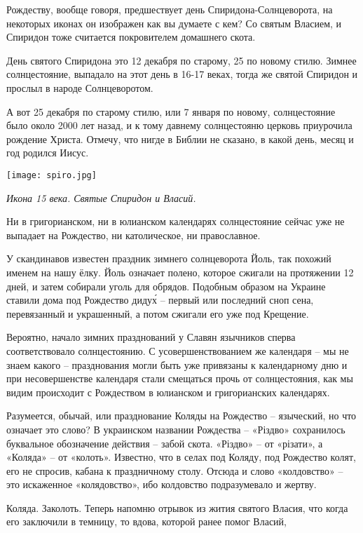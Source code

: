 \documentclass[a5paper,11pt,openany]{article}
\begin{document}
   Рождеству, вообще говоря, предшествует день Спиридона-Солнцеворота, на некоторых иконах он изображен как вы думаете с кем? Со святым Власием, и Спиридон тоже считается покровителем домашнего скота.

  День святого Спиридона это 12 декабря по старому, 25 по новому стилю. Зимнее солнцестояние, выпадало на этот день в 16-17 веках, тогда же святой Спиридон и прослыл в народе Солнцеворотом. 


А вот 25 декабря по старому стилю, или 7 января по новому, солнцестояние было около 2000 лет назад, и к тому давнему солнцестояню церковь приурочила рождение Христа. Отмечу, что нигде в Библии не сказано, в какой день, месяц и год родился Иисус.

\begin{center}
\texttt{[image: spiro.jpg]}

\textit{Икона 15 века. Святые Спиридон и Власий.}
\end{center}




   Ни в григорианском, ни в юлианском календарях солнцестояние сейчас уже не выпадает на Рождество, ни католическое, ни православное.

   У скандинавов известен праздник зимнего солнцеворота Йоль, так похожий именем на нашу ёлку. Йоль означает полено, которое сжигали на протяжении 12 дней, и затем собирали уголь для обрядов. Подобным образом на Украине ставили дома под Рождество диду\'х – первый или последний сноп сена, перевязанный и украшенный, а потом сжигали его уже под Крещение.

   Вероятно, начало зимних празднований у Славян язычников сперва соответствовало  солнцестоянию. С усовершенствованием же календаря – мы не знаем какого – празднования могли быть уже привязаны к календарному дню и при несовершенстве календаря стали смещаться прочь от солнцестояния, как мы видим происходит с Рождеством в юлианском и григорианских календарях.

  Разумеется, обычай, или празднование Коляды на Рождество – языческий, но что означает это слово? В украинском названии
Рождества – «Різдво» сохранилось буквальное обозначение действия – забой скота. «Різдво» – от «різати», а «Коляда» – от «колоть». Известно, что в селах под Коляду, под Рождество колят, его не спросив, кабана к праздничному столу. Отсюда и слово «колдовство» – это искаженное «колядовство», ибо колдовство подразумевало и жертву.

   Коляда. Заколоть. Теперь напомню отрывок из жития святого Власия, что когда его заключили в темницу, то вдова, которой ранее помог Власий,
\end{document}
